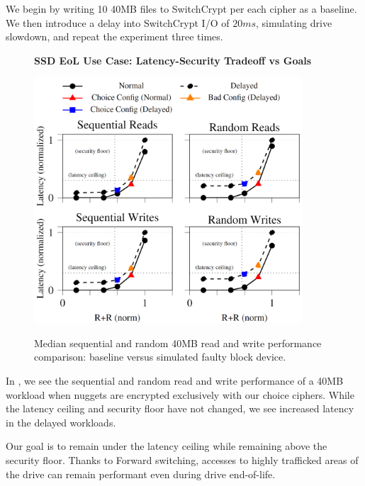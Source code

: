 We begin by writing 10 40MB files to SwitchCrypt per each cipher as a baseline.
We then introduce a delay into SwitchCrypt I/O of $20ms$, simulating drive
slowdown, and repeat the experiment three times.

\begin{figure}[ht] \textbf{SSD EoL Use Case: Latency-Security Tradeoff vs
   Goals}\par\medskip
   \centering
   {\includegraphics[width=10cm]{figs/sc/screenie.png}}
   \caption{Median sequential and random 40MB read and write performance
   comparison: baseline versus simulated faulty block device.}
  \label{fig:usecase-eol-tradeoff}
\end{figure}

In , we see the sequential and random read and
write performance of a 40MB workload when nuggets are encrypted exclusively with
our choice ciphers. While the latency ceiling and security floor have not
changed, we see increased latency in the delayed workloads.

Our goal is to remain under the latency ceiling while remaining above the
security floor. Thanks to Forward switching, accesses to highly trafficked areas
of the drive can remain performant even during drive end-of-life.
